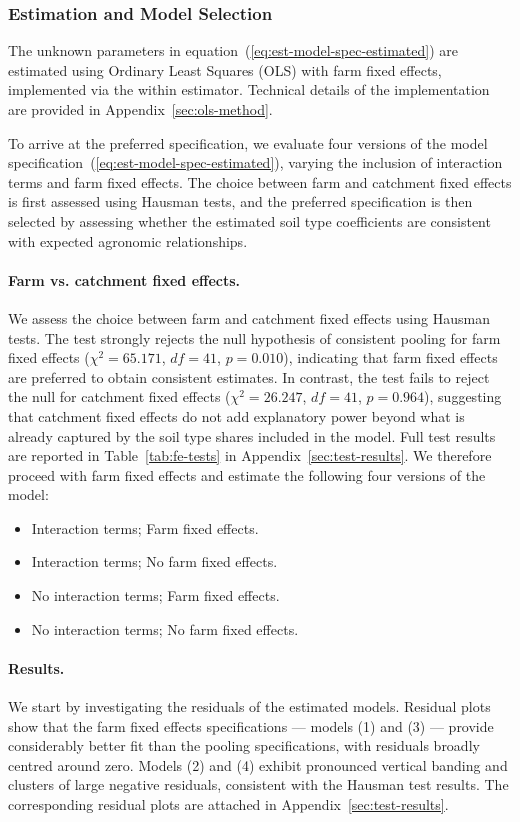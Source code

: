 \documentclass[12pt]{article}
\begin{document}
\subsubsection{Estimation and Model Selection}
\label{sec:estimation-and-model-selection}
The unknown parameters in equation~(\ref{eq:est-model-spec-estimated}) are 
estimated using Ordinary Least Squares (OLS) with farm fixed effects, implemented 
via the within estimator. Technical details of the implementation are provided in 
Appendix~\ref{sec:ols-method}.

To arrive at the preferred specification, we evaluate four versions of the model specification~(\ref{eq:est-model-spec-estimated}), varying the inclusion of interaction terms and farm fixed effects. 
The choice between farm and catchment fixed effects is first assessed using Hausman tests, and the preferred specification is then selected by assessing whether the estimated soil type coefficients are consistent with expected agronomic relationships.

\paragraph{Farm vs. catchment fixed effects.}
We assess the choice between farm and catchment fixed effects using Hausman tests. 
The test strongly rejects the null hypothesis of consistent pooling for 
farm fixed effects ($\chi^2 = 65.171$, $df = 41$, $p = 0.010$), indicating 
that farm fixed effects are preferred to obtain consistent estimates. 
In contrast, the test fails to reject the null for catchment fixed effects 
($\chi^2 = 26.247$, $df = 41$, $p = 0.964$), suggesting that catchment fixed 
effects do not add explanatory power beyond what is already captured by the soil 
type shares included in the model. 
Full test results are reported in Table~\ref{tab:fe-tests} in 
Appendix~\ref{sec:test-results}. 
We therefore proceed with farm fixed effects and estimate the following four versions of the model:
\begin{itemize}
    \item[(1)] Interaction terms; Farm fixed effects.
    \item[(2)] Interaction terms; No farm fixed effects.
    \item[(3)] No interaction terms; Farm fixed effects.
    \item[(4)] No interaction terms; No farm fixed effects.
\end{itemize}

\paragraph{Results.}
We start by investigating the residuals of the estimated models.
Residual plots show that the farm fixed effects specifications --- models (1) and (3) --- provide considerably better fit than the pooling specifications, with residuals broadly centred around zero. 
Models (2) and (4) exhibit pronounced vertical banding and clusters of large negative residuals, consistent with the Hausman test results. 
The corresponding residual plots are attached in Appendix~\ref{sec:test-results}.
\end{document}
